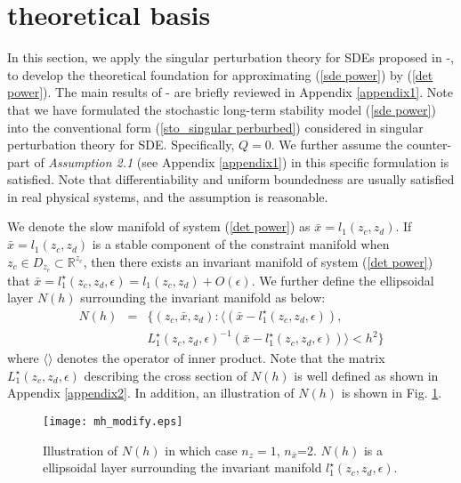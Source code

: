 \documentclass[journal]{IEEEtran}
\newcommand{\ee}{\epsilon}
\begin{document}
\section{theoretical basis}\label{sectiontheory}
In this section, we apply the singular perturbation theory for SDEs proposed in \cite{Gentz:2006}-\cite{Freidlin:book}, to develop the theoretical foundation for  approximating (\ref{sde power}) by (\ref{det power}). The main results of \cite{Gentz:2006}-\cite{Freidlin:book} are briefly reviewed in Appendix \ref{appendix1}. Note that we have formulated the stochastic long-term stability model (\ref{sde power}) into the conventional form (\ref{sto_singular perburbed}) considered in singular perturbation theory for SDE. Specifically, $Q=0$. We further assume the counter-part of \textit{Assumption 2.1} (see Appendix \ref{appendix1}) in this specific formulation is satisfied. Note that differentiability and uniform boundedness are usually satisfied in real physical systems, and the assumption is reasonable. 











We denote the slow manifold of system (\ref{det power}) as $\bar{x}=l_1(z_c,z_d)$. If $\bar{x}=l_1(z_c,z_d)$ is a stable component of the constraint manifold when $z_c\in D_{z_c}\subset\mathbb{R}^{z_c}$, then there exists an invariant manifold of system (\ref{det power}) that $\bar{x}=l_1^\star(z_c,z_d,\ee)=l_1(z_c,z_d)+O(\ee)$. We further define the ellipsoidal layer $N(h)$ surrounding the invariant manifold as below:
\begin{eqnarray}
N(h)&=&\{(z_c,\bar{x},z_d):\langle (\bar{x}-l_1^\star(z_c,z_d,\ee)),\nonumber\\
&&L_1^\star(z_c,z_d,\ee)^{-1}(\bar{x}-l_1^\star(z_c,z_d,\ee))\rangle< h^2 \}
\end{eqnarray}
where $\langle\rangle$ denotes the operator of inner product. Note that the matrix $L_1^\star(z_c,z_d,\ee)$ describing the cross section of $N(h)$ is well defined as shown in Appendix \ref{appendix2}. In addition, an illustration of $N(h)$ is shown in Fig. \ref{M(h)}. \begin{figure}[!ht]
\centering
\texttt{[image: mh\_modify.eps]}\caption{Illustration of $N(h)$ in which case $n_z=1$, $n_{\bar{x}}$=2. $N(h)$ is a ellipsoidal layer surrounding the invariant manifold $l_1^\star(z_c,z_d,\ee)$. }\label{M(h)}
\end{figure}
\end{document}
